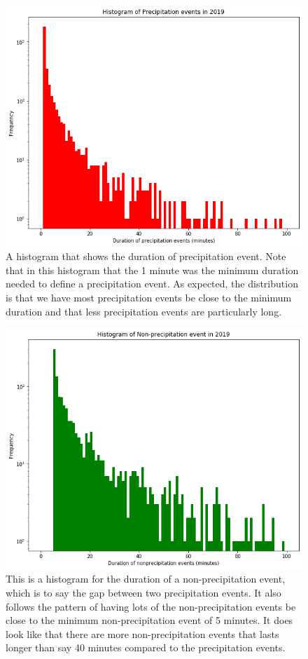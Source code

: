 \begin{figure}[h]
\centering
\includegraphics[width=150mm]{../Figures/precip_hist_1min.png}
\caption{\label{abcf}A histogram that shows the duration of precipitation
event. Note that in this histogram that the 1 minute was the minimum
duration needed to define a precipitation event. As expected, the
distribution is that we have most precipitation events be close to the
minimum duration and that less precipitation events are particularly
long. } 
\end{figure}
\begin{figure}[h]
\centering \includegraphics[width=150mm]{../Figures/nonprecip_hist_5min.png} 
\caption{\label{abcg}This is a histogram for the duration of a
non-precipitation event, which is to say the gap between two
precipitation events. It also follows the pattern of having lots of
the non-precipitation events be close to the minimum non-precipitation
event of 5 minutes. It does look like that there are more
non-precipitation events that lasts longer than say 40 minutes
compared to the precipitation events. }
\end{figure}
